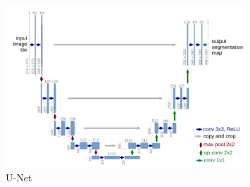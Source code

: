 \begin{figure}[!ht]
  \begin{center}
    \includegraphics[width=0.8\textwidth]{Immagini/unet.png}
  \end{center}
  \caption{U-Net}\label{fig:unet}
\end{figure}


%
%
%
%


